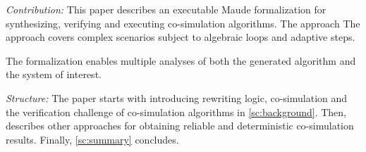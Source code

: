 \textit{Contribution:}
This paper describes an executable Maude formalization for synthesizing, verifying and executing co-simulation algorithms.
The approach 
The approach covers complex scenarios subject to algebraic loops and adaptive steps.

The formalization enables multiple analyses of both the generated algorithm and the system of interest. 

\textit{Structure:}
The paper starts with introducing rewriting logic, co-simulation and the verification challenge of co-simulation algorithms in \cref{sc:background}. Then,  describes other approaches for obtaining reliable and deterministic co-simulation results. 
Finally, \cref{sc:summary} concludes.